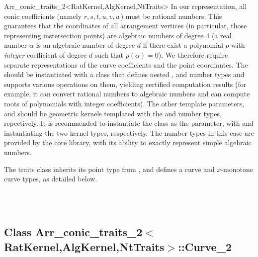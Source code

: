 \begin{ccRefClass}{Arr_conic_traits_2<RatKernel,AlgKernel,NtTraits>}
In our representation, all conic coefficients (namely $r, s, t, u, v, w$)
must be rational numbers. This guarantees that the coordinates of all
arrangement vertices (in particular, those representing instersection
points) are algebraic numbers of degree $4$ (a real number $\alpha$
is an algebraic number of degree $d$ if there exist a polynomial $p$ with
{\sl integer} coefficient of degree $d$ such that $p(\alpha) = 0$).
We therefore require separate representations of the curve coefficients and
the point coordiantes. The  should be instantiated with a class
that defines nested ,  and 
number types and supports various operations on them, yielding certified
computation results (for example, it can convert rational numbers to algebraic
numbers and can compute roots of polynomials with integer coefficients).
The other template parameters,  and  should be
geometric kernels templated with the  and
 number types, repectively.
It is recommended to instantiate the 
class as the  parameter, with
 and 
instantiating the two kernel types, respectively.
The number types in this case are provided by the {\sc core} library, with its
ability to exactly represent simple algebraic numbers.

The traits class inherits its point type from ,
and defines a curve and $x$-monotone curve types, as detailed below.

 
\ccIsModel
     \\
     \\

\ccTypes



\subsection*{Class 
        Arr\_conic\_traits\_2$<$RatKernel,AlgKernel,NtTraits$>$::Curve\_2}


\end{ccRefClass}
